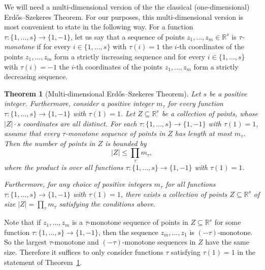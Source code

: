 \documentclass[11pt]{article}
\newtheorem{theorem}{Theorem}[section]
\theoremstyle{definition}
\numberwithin{equation}{section}
\numberwithin{figure}{section}
\newcommand{\su}{\subseteq}
\begin{document}
We will need a multi-dimensional version of the the classical (one-dimensional) Erd\H{o}s--Szekeres Theorem. For our purposes, this multi-dimensional version is most convenient to state in the following way. For a function $\tau:\{1,\dots,s\}\to \{1,-1\}$, let us say that a sequence of points $z_1,\dots,z_m\in \mathbb{R}^s$ is \emph{$\tau$-monotone} if for every $i\in \{1,\dots,s\}$ with $\tau(i)=1$ the $i$-th coordinates of the points $z_1,\dots,z_m$ form a strictly increasing sequence and for every $i\in \{1,\dots,s\}$ with $\tau(i)=-1$ the $i$-th coordinates of the points $z_1,\dots,z_m$ form a strictly decreasing sequence. 

\begin{theorem}[Multi-dimensional Erd\H{o}s--Szekeres Theorem]\label{thm_es}
Let $s$ be a positive integer. Furthermore, consider a positive integer $m_\tau$ for every function $\tau:\{1,\dots,s\}\to \{1,-1\}$ with $\tau(1)=1$. Let $Z\su \mathbb{R}^s$ be a collection of points, whose $|Z|\cdot s$ coordinates are all distinct. For each $\tau:\{1,\dots,s\}\to \{1,-1\}$ with $\tau(1)=1$, assume that every $\tau$-monotone sequence of points in $Z$ has length at most $m_\tau$. Then the number of points in $Z$ is bounded by
\[|Z|\le \prod_{\tau} m_{\tau},\]
where the product is over all functions $\tau:\{1,\dots,s\}\to \{1,-1\}$ with $\tau(1)=1$.

Furthermore, for any choice of positive integers $m_\tau$ for all functions $\tau:\{1,\dots,s\}\to \{1,-1\}$ with $\tau(1)=1$, there exists a collection of points $Z\su \mathbb{R}^s$ of size $|Z|=\prod_\tau m_\tau$ satisfying the conditions above.
\end{theorem}

Note that if $z_1, \ldots, z_m$ is a $\tau$-monotone sequence of points in $Z\su \mathbb{R}^s$ for some function $\tau: \{1,\dots,s\}\to \{1,-1\}$, then the sequence $z_m, \ldots, z_1$ is $(-\tau)$-monotone. So the largest $\tau$-monotone and $(-\tau)$-monotone sequences in $Z$ have the same size. Therefore it suffices to only consider functions $\tau$ satisfying $\tau(1)=1$ in the statement of Theorem~\ref{thm_es}.
\end{document}
